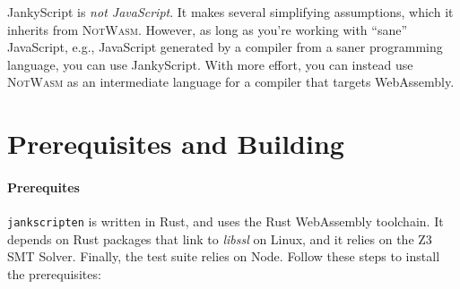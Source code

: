 \documentclass{book}
\newcommand{\system}{\texttt{jankscripten}\xspace}
\newcommand{\notwasm}{\textsc{NotWasm}\xspace}
\newcommand{\jankyscript}{JankyScript\xspace}
\begin{document}
\jankyscript is \emph{not JavaScript}. It makes several simplifying
assumptions, which it inherits from \notwasm. However, as long as you're
working with ``sane'' JavaScript, e.g., JavaScript generated by a compiler from
a saner programming language, you can use JankyScript. With more effort, you
can instead use \notwasm as an intermediate language for a compiler that
targets WebAssembly.

\section{Prerequisites and Building}

\paragraph{Prerequites}
\system is written in Rust, and uses the Rust WebAssembly toolchain. It depends
on Rust packages that link to \emph{libssl} on Linux, and it relies on the Z3
SMT Solver. Finally, the test suite relies on Node. Follow these steps to
install the prerequisites:
\end{document}
